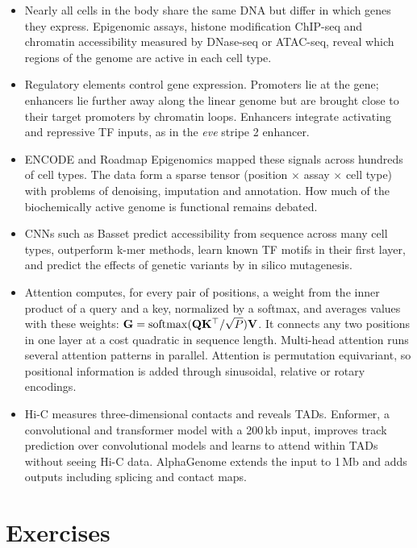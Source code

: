 \begin{itemize}
  \item Nearly all cells in the body share the same DNA but differ in which genes they express. Epigenomic assays, histone modification ChIP-seq and chromatin accessibility measured by DNase-seq or ATAC-seq, reveal which regions of the genome are active in each cell type.
  \item Regulatory elements control gene expression. Promoters lie at the gene; enhancers lie further away along the linear genome but are brought close to their target promoters by chromatin loops. Enhancers integrate activating and repressive TF inputs, as in the \textit{eve} stripe 2 enhancer.
  \item ENCODE and Roadmap Epigenomics mapped these signals across hundreds of cell types. The data form a sparse tensor (position $\times$ assay $\times$ cell type) with problems of denoising, imputation and annotation. How much of the biochemically active genome is functional remains debated.
  \item CNNs such as Basset predict accessibility from sequence across many cell types, outperform k-mer methods, learn known TF motifs in their first layer, and predict the effects of genetic variants by in silico mutagenesis.
  \item Attention computes, for every pair of positions, a weight from the inner product of a query and a key, normalized by a softmax, and averages values with these weights: $\mathbf{G}=\operatorname{softmax}(\mathbf{Q}\mathbf{K}^\top/\sqrt{P})\mathbf{V}$. It connects any two positions in one layer at a cost quadratic in sequence length. Multi-head attention runs several attention patterns in parallel. Attention is permutation equivariant, so positional information is added through sinusoidal, relative or rotary encodings.
  \item Hi-C measures three-dimensional contacts and reveals TADs. Enformer, a convolutional and transformer model with a 200\,kb input, improves track prediction over convolutional models and learns to attend within TADs without seeing Hi-C data. AlphaGenome extends the input to 1\,Mb and adds outputs including splicing and contact maps.
\end{itemize}

\section*{Exercises}


